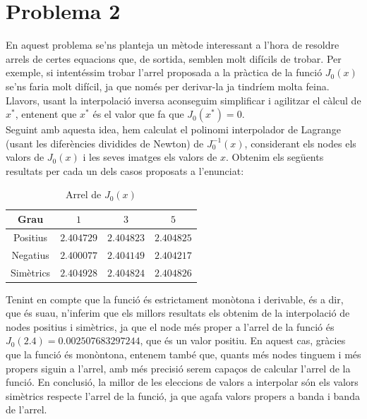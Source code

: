 \documentclass[a4paper,11pt]{article}
\begin{document}
\section*{Problema 2}
  En aquest problema se'ns planteja un mètode interessant a l'hora de resoldre arrels de certes equacions que, de sortida, semblen molt difícils de trobar. Per exemple, si intentéssim trobar l'arrel proposada a la pràctica de la funció $J_0(x)$ se'ns faria molt difícil, ja que només per derivar-la ja tindríem molta feina. Llavors, usant la interpolació inversa aconseguim simplificar i agilitzar el càlcul de $x^*$, entenent que $x^*$ és el valor que fa que $J_0(x^*) = 0$.\\
  Seguint amb aquesta idea, hem calculat el polinomi interpolador de Lagrange (usant les diferències dividides de Newton) de $J_0^{-1}(x)$, considerant els nodes els valors de $J_0(x)$ i les seves imatges els valors de $x$. Obtenim els següents resultats per cada un dels casos proposats a l'enunciat:
  \begin{table}[H]
  \begin{center}
    \begin{tabular}{|c|c|c|c|}
      \hline
      Grau & $1$ & $3$ & $5$ \\
      \hline
      Positius & $2.404729$ & $2.404823$ & $2.404825$ \\
      \hline
      Negatius & $2.400077$ & $2.404149$ & $2.404217$ \\
      \hline
      Simètrics & $2.404928$ & $2.404824$ & $2.404826$ \\
      \hline
    \end{tabular}
    \caption{Arrel de $J_0(x)$}
  \end{center}
  \end{table}
  Tenint en compte que la funció és estrictament monòtona i derivable, és a dir, que és suau, n'inferim que els millors resultats els obtenim de la interpolació de nodes positius i simètrics, ja que el node més proper a l'arrel de la funció és $J_0(2.4) = 0.002507683297244$, que és un valor positiu. En aquest cas, gràcies que la funció és monòntona, entenem també que, quants més nodes tinguem i més propers siguin a l'arrel, amb més precisió serem capaços de calcular l'arrel de la funció. En conclusió, la millor de les eleccions de valors a interpolar són els valors simètrics respecte l'arrel de la funció, ja que agafa valors propers a banda i banda de l'arrel.
\end{document}
